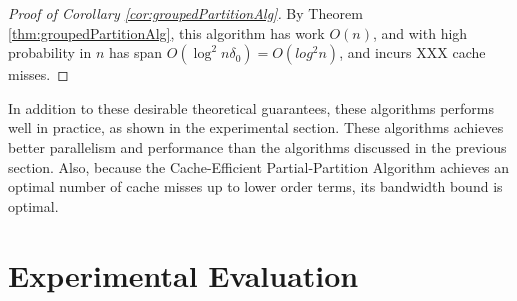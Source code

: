 \documentclass[sigconf]{acmart}
\theoremstyle{remark}
\theoremstyle{remark}
\begin{document}
\begin{proof}[Proof of Corollary \ref{cor:groupedPartitionAlg}]
	By Theorem \ref{thm:groupedPartitionAlg}, this algorithm has work $O(n)$, and with high probability in $n$ has span $O(\log^2 n\delta_0) = O(log^2 n)$, and incurs XXX cache misses.
\end{proof}

In addition to these desirable theoretical guarantees, these algorithms performs well in practice, as shown in the experimental section.
These algorithms achieves better parallelism and performance than the algorithms discussed in the previous section.
Also, because the Cache-Efficient Partial-Partition Algorithm achieves an optimal number of cache misses up to lower order terms, its bandwidth bound is optimal.

\section{Experimental Evaluation}\label{secexp}



\begin{figure*}
  \begin{center}
    \CILKsorttable
  \end{center}
  \caption{We compare the performance of the low-space and high-span
    sorting implementations running on varying numbers of threads and
    input sizes. The $x$-axis is the number of worker threads, the
    $y$-axis is the multiplicative speedup when compared to the serial
    baseline, and the log-base-two size of the input is indicated for
    each curve in the key. Each time (including each serial baseline)
    is averaged over five trials.}
  \label{tablesort}
\end{figure*}



\begin{figure*}
  \begin{center}
    \CILKtable 
  \end{center}
    \caption{For a fixed table-size $n = 2^{28}$, we compare each
      implementation's runtime to a serial baseline, which takes 0.96
      seconds to complete (averaged over five trials). The $x$-axis
      plots the number of worker threads being used, and the $y$-axis
      plots the multiplicative speedup over the serial baseline. Each
      time is averaged over five trials.}
      \label{tablecilk}
\end{figure*}
\end{document}
